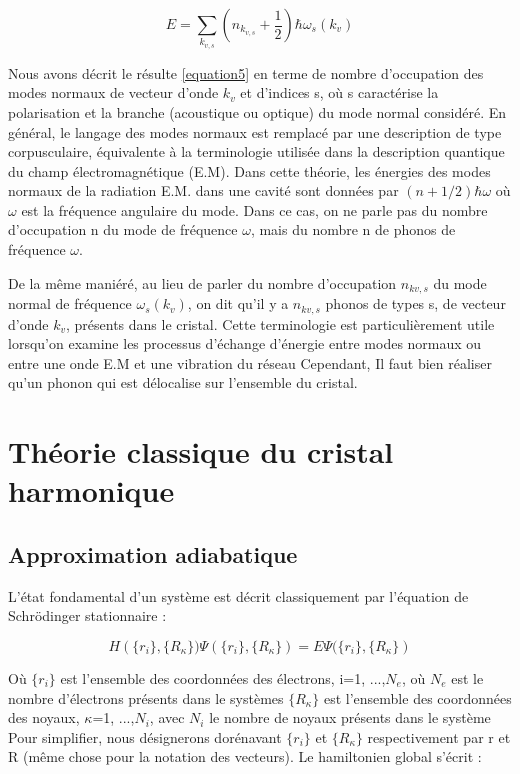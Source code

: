 \begin{equation}
E = \sum_{k_{v,s}} \left (n_{k_{v,s}}+\frac{1}{2}\right)\hbar\omega_{s}(k_{v}) \label{equation5}
\end{equation}

Nous avons décrit le résulte \ref{equation5} en terme de nombre d'occupation des modes normaux de vecteur d'onde $k_{v}$ et d'indices s, où s caractérise la polarisation et la branche (acoustique ou optique) du mode normal considéré. En général, le langage des modes normaux est remplacé par une description de type corpusculaire, équivalente à la terminologie utilisée dans la description quantique du champ électromagnétique (E.M). Dans cette théorie, les énergies des modes normaux de la radiation E.M. dans une cavité sont données par $(n+1/2)\hbar\omega$ où $\omega$ est la fréquence angulaire du mode. Dans ce cas, on ne parle pas du nombre d'occupation n du mode de fréquence $\omega$, mais du nombre n de phonos de fréquence $\omega$.

De la même maniéré, au lieu de parler du nombre d'occupation $n_{kv,s}$ du mode normal de fréquence $\omega_{s}(k_{v})$, on dit qu'il y a $n_{kv,s}$ phonos de types s, de vecteur d'onde $k_{v}$, présents dans le cristal. Cette terminologie est particulièrement utile lorsqu'on examine les processus d'échange d'énergie entre modes normaux ou entre une onde E.M et une vibration du réseau Cependant, Il faut bien réaliser qu'un phonon qui est délocalise sur l'ensemble du cristal.

\section{Théorie classique du cristal harmonique}

\subsection{Approximation adiabatique}

L'état fondamental d'un système est décrit classiquement par l'équation de Schr\"{o}dinger stationnaire :

\begin{equation}
H\left(\{r_{i}\},\{R_{\kappa}\})\Psi(\{r_{i}\},\{R_{\kappa}\}) = E\Psi(\{r_{i}\},\{R_{\kappa}\}\right)
\end{equation}

Où $\{r_{i}\}$ est l'ensemble des coordonnées des électrons, i=1, ...,$N_{e}$, où $N_{e}$ est le nombre d'électrons présents dans le systèmes $\{R_{\kappa}\}$ est l'ensemble des coordonnées des noyaux, $\kappa$=1, ...,$N_{i}$, avec $N_{i}$ le nombre de noyaux présents dans le système Pour simplifier, nous désignerons dorénavant $\{r_{i}\}$ et $\{R_{\kappa}\}$ respectivement par r et R (même chose pour la notation des vecteurs). Le hamiltonien global s'écrit :

